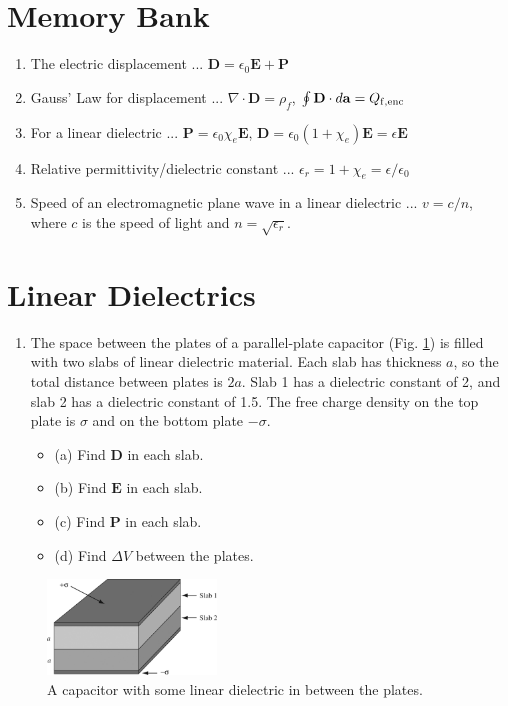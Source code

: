 \documentclass[12pt]{article}
\begin{document}
\small
\maketitle
\small
\section{Memory Bank}
\begin{enumerate}
\item The electric displacement ... $\mathbf{D} = \epsilon_0 \mathbf{E} + \mathbf{P}$
\item Gauss' Law for displacement ... $\nabla \cdot \mathbf{D} = \rho_f$, $\oint \mathbf{D} \cdot d\mathbf{a} = Q_{\rm f,enc}$
\item For a linear dielectric ... $\mathbf{P} = \epsilon_0 \chi_e \mathbf{E}$, \hspace{0.25cm} $\mathbf{D} = \epsilon_0(1+\chi_e) \mathbf{E} = \epsilon \mathbf{E}$
\item Relative permittivity/dielectric constant ... $\epsilon_r = 1+\chi_e = \epsilon/\epsilon_0$
\item Speed of an electromagnetic plane wave in a linear dielectric ... $v = c/n$, where $c$ is the speed of light and $n = \sqrt{\epsilon_r}$.
\end{enumerate}

\section{Linear Dielectrics}

\begin{enumerate}
\item The space between the plates of a parallel-plate capacitor (Fig. \ref{fig:1}) is filled with two slabs of linear dielectric material.  Each slab has thickness $a$, so the total distance between plates is $2a$.  Slab 1 has a dielectric constant of 2, and slab 2 has a dielectric constant of 1.5.  The free charge density on the top plate is $\sigma$ and on the bottom plate $-\sigma$.
\begin{itemize}
\item (a) Find $\mathbf{D}$ in each slab.
\item (b) Find $\mathbf{E}$ in each slab.
\item (c) Find $\mathbf{P}$ in each slab.
\item (d) Find $\Delta V$ between the plates.
\end{itemize}
\end{enumerate}

\begin{figure}
\centering
\includegraphics[width=0.4\textwidth]{figures/4_24.jpg}
\caption{\label{fig:1} A capacitor with some linear dielectric in between the plates.}
\end{figure}
\end{document}
